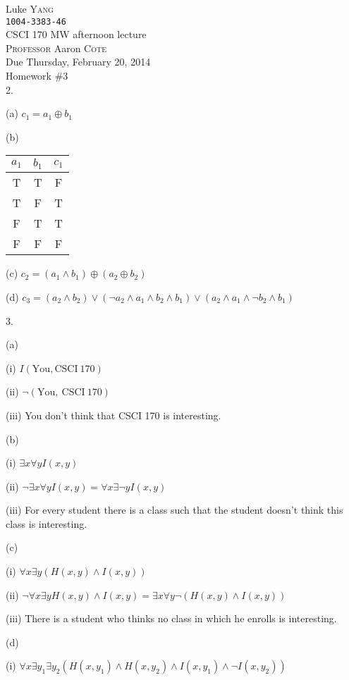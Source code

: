 \documentclass[UTF8,12pt,letterpaper,oneside]{amsart}
\begin{document}
\noindent Luke \textsc{Yang}\\
\texttt{1004-3383-46}\\
CSCI 170 MW afternoon lecture\\
\textsc{Professor} Aaron \textsc{Cote}\\
Due Thursday, February 20, 2014\\
Homework \#3\\

2. 

(a) $c_1 = a_1 \oplus b_1$

(b) 

\begin{tabular}{ccc}
$a_1$ & $b_1$ & $c_1$ \\\hline
T   & T   & F\\\hline
T   & F   & T\\\hline
F   & T   & T\\\hline
F   & F   & F\\\hline
\end{tabular}

(c) $c_2 = (a_1 \land b_1) \oplus (a_2 \oplus b_2)$

(d) $c_3 = (a_2 \land b_2) \lor (\lnot a_2 \land a_1 \land b_2 \land b_1) \lor (a_2 \land a_1 \land \lnot b_2 \land b_1)$

3.

(a)

(i) $I(\mathrm{You, CSCI\ 170})$

(ii) $\lnot(\mathrm{You,\ CSCI\ 170})$

(iii) You don't think that CSCI 170 is interesting.

(b)

(i) $\exists x \forall y I(x, y)$

(ii) $\lnot \exists x \forall y I(x, y) = \forall x \exists \lnot y I(x, y)$

(iii) For every student there is a class such that the student doesn't think this class is interesting.

(c)

(i) $\forall x \exists y (H(x, y) \land I(x, y))$

(ii) $\lnot \forall x \exists y H(x, y) \land I(x, y) = \exists x \forall y \lnot (H(x, y) \land I(x, y))$

(iii) There is a student who thinks no class in which he enrolls is interesting.

(d)

(i) $\forall x \exists y_1 \exists y_2 (H(x, y_1) \land H(x, y_2) \land I(x, y_1) \land \lnot I(x, y_2))$
\end{document}
